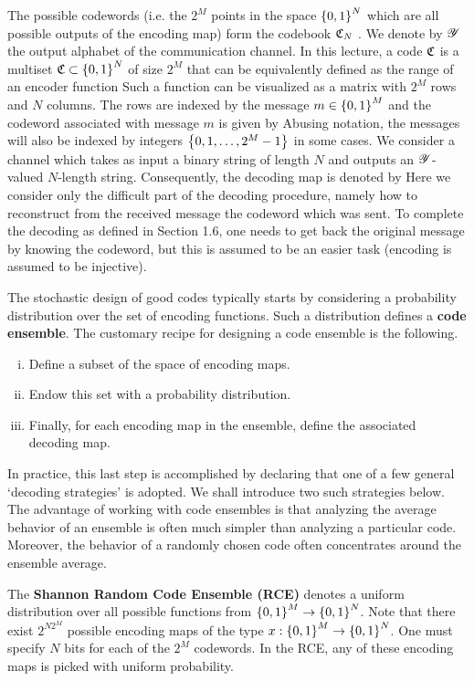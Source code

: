\documentclass[letterpaper,english,10pt]{article}
\begin{document}
The possible codewords (i.e. the $2^M$ points in the space $\left\{0, 1\right\}^N$ which are all possible outputs of the encoding map) form the codebook $\mathfrak{C}_N$ . 
We denote by $\mathscr{Y}$ the output alphabet of the communication channel.
In this lecture, a code $\mathfrak{C}$ is a multiset $\mathfrak{C} \subset \left\{0,1\right\}^N$ of size $2^M$ that can be equivalently defined as the range of an encoder function
Such a function can be visualized as a matrix with $2^M$ rows and $N$ columns. 
The rows are indexed by the message $m \in \left\{0,1\right\}^M$ and the codeword associated with message $m$ is given by
Abusing notation, the messages will also be indexed by integers $\left\{0, 1, \dots, 2^M-1\right\}$ in some cases. 
We consider a channel which takes as input a binary string of length $N$ and outputs an $\mathscr{Y}$-valued $N$-length string. 
Consequently, the decoding map is denoted by 
Here we consider only the difficult part of the decoding procedure, namely how to reconstruct from the received message the codeword which was sent. 
To complete the decoding as defined in Section 1.6, one needs to get back the original message by knowing the codeword, but this is assumed to be an easier task (encoding is assumed to be injective). 

The stochastic design of good codes typically starts by considering a probability distribution over the set of encoding functions. 
Such a distribution defines a \textbf{code ensemble}. 
The customary recipe for designing a code ensemble is the following. 
\begin{enumerate}[(i)]
\item Define a subset of the space of encoding maps. 
\item Endow this set with a probability distribution. 
\item Finally, for each encoding map in the ensemble, define the associated decoding map. 
\end{enumerate}
In practice, this last step is accomplished by declaring that one of a few general `decoding strategies' is adopted. 
We shall introduce two such strategies below.
The advantage of working with code ensembles is that analyzing the average behavior of an ensemble is often much simpler than analyzing a particular code. 
Moreover, the behavior of a randomly chosen code often concentrates around the ensemble average. 

The \textbf{Shannon Random Code Ensemble (RCE)} denotes a uniform distribution over all
possible functions from $\left\{0,1\right\}^M \to \left\{0,1\right\}^N$. 
Note that there exist $2^{N2^M}$ possible encoding maps of the type $x: \left\{0,1\right\}^M \to \left\{0,1\right\}^N$. 
One must specify $N$ bits for each of the $2^M$ codewords. 
In the RCE, any of these encoding maps is picked with uniform probability. 
\end{document}
